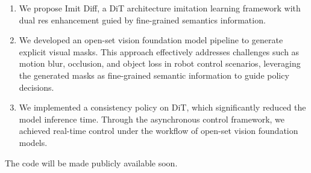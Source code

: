 \begin{enumerate}

\item We propose Imit Diff, a DiT architecture imitation learning framework with dual res enhancement guied by fine-grained semantics information.

\item We developed an open-set vision foundation model pipeline to generate explicit visual masks. This approach effectively addresses challenges such as motion blur, occlusion, and object loss in robot control scenarios, leveraging the generated masks as fine-grained semantic information to guide policy decisions.

\item We implemented a consistency policy on DiT, which significantly reduced the model inference time. Through the asynchronous control framework, we achieved real-time control under the workflow of open-set vision foundation models.

\end{enumerate}

The code will be made publicly available soon.